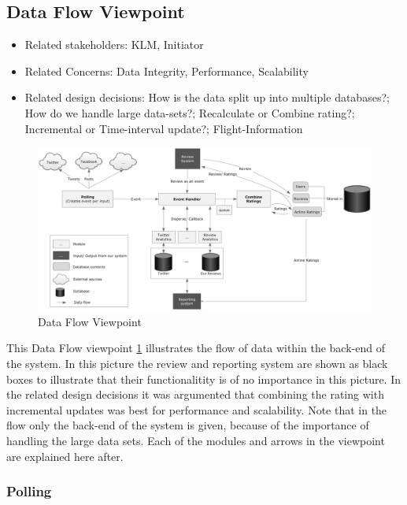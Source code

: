 % 

\subsection{Data Flow Viewpoint}

\begin{itemize}
\item Related stakeholders: KLM, Initiator
\item Related Concerns: Data Integrity, Performance, Scalability
\item Related design decisions: How is the data split up into multiple databases?; How do we handle large data-sets?; Recalculate or Combine rating?; Incremental or Time-interval update?; Flight-Information
\end{itemize}

\newpage
\begin{landscape}
\begin{figure}
\includegraphics[width=600px]{DataFlowGraph}
\caption{Data Flow Viewpoint}
\label{fig:Data Flow}
\end{figure}
\end{landscape}

This Data Flow viewpoint \ref{fig:Data Flow} illustrates the flow of data within the back-end of the system. In this picture the review and reporting system are shown as black boxes to illustrate that their functionalitity is of no importance in this picture.
In the related design decisions it was argumented that combining the rating with incremental updates was best for performance and scalability. Note that in the flow only the back-end of the system is given, because of the importance of handling the large data sets. Each of the modules and arrows in the viewpoint are explained here after.

\subsubsection{Polling}


